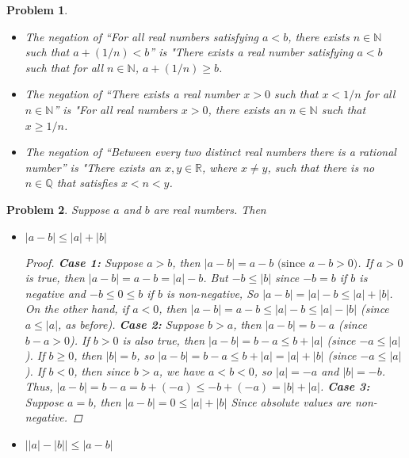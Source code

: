 \documentclass[12pt]{article}
\newtheorem{problem}{Problem}
\newcommand{\QQ}{\ensuremath{\mathbb Q}}
\newcommand{\RR}{\ensuremath{\mathbb R}}
\newcommand{\NN}{\ensuremath{\mathbb N}}
\begin{document}
\begin{problem} %


\begin{itemize}
	\item[(a)] The negation of ``For all real numbers satisfying $a<b$, there exists $n\in\NN$ such that $a+(1/n)<b$'' is "There exists a real number satisfying $a<b$ such that for all $n \in \NN$, $a + (1/n) \geq b$.

\item[(b)] The negation of ``There exists a real number $x>0$ such that $x<1/n$ for all $n\in\NN$'' is "For all real numbers $x > 0$, there exists an $n \in \NN$ such that $x \geq 1/n$.

\item[(b)] The negation of ``Between every two distinct real numbers there is a rational number'' is "There exists an $x,y \in \RR$, where $x \neq y$, such that there is no $n \in \QQ$ that satisfies $ x < n < y$.
\end{itemize}
\end{problem}



\begin{problem} %
Suppose $a$ and $b$ are real numbers.  Then
\begin{itemize}
\item[(a)] $|a-b| \le |a|+|b|$
	\begin{proof}
		\textbf{Case 1:} Suppose $a > b$, then $|a - b| = a - b \text{ (since $a-b > 0$)}$. If $a > 0$ is true, then $|a - b| = a - b = |a| - b$. But $-b \leq |b|$ since $-b = b$ if $b$ is negative and $-b \leq 0 \leq b$ if $b$ is non-negative, So $|a - b| = |a| - b \leq |a| + |b|$. On the other hand, if $a < 0$, then $|a - b| = a - b \leq |a| - b \leq |a| - |b|$ (since $a \leq |a|$, as before). \newline
		\textbf{Case 2:} Suppose $b > a$, then $|a - b| = b - a$ (since $b - a > 0$). If $b > 0$ is also true, then $|a-b| = b- a \leq b + |a|$ (since $-a \leq |a|$). If $b \geq 0$, then $|b| = b$, so $|a-b| = b - a \leq b + |a| = |a| + |b| $ (since $-a \leq |a|$). If $b < 0$, then since $b > a$, we have $a < b < 0$, so $|a| = -a$ and $|b| = -b$. Thus, $|a-b| = b - a = b + (-a) \leq -b + (-a) = |b| + |a|$. \newline
		\textbf{Case 3:} Suppose $a = b$, then $|a - b| = 0 \leq |a| + |b|$ Since absolute values are non-negative.
	\end{proof}
\item[(b)] $\big||a|-|b|\big| \le |a-b|$
\end{itemize}
\end{problem}
\end{document}

